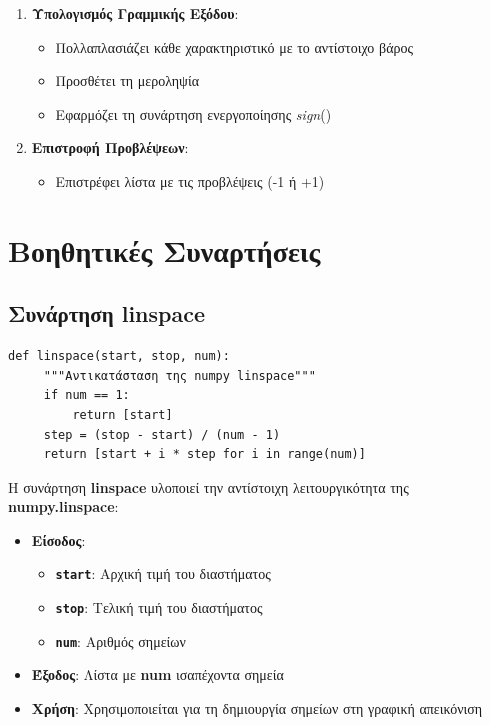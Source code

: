 \documentclass[12pt,a4paper,twoside]{book}
\begin{document}
\begin{enumerate}
    \item \textbf{Υπολογισμός Γραμμικής Εξόδου}:
    \begin{itemize}
        \item Πολλαπλασιάζει κάθε χαρακτηριστικό με το αντίστοιχο βάρος
        \item Προσθέτει τη μεροληψία
        \item Εφαρμόζει τη συνάρτηση ενεργοποίησης \textit{sign}() %
    \end{itemize}
    \item \textbf{Επιστροφή Προβλέψεων}:
    \begin{itemize}
        \item Επιστρέφει λίστα με τις προβλέψεις (-1 ή +1)
    \end{itemize}
\end{enumerate}

\section{Βοηθητικές Συναρτήσεις}

\subsection{Συνάρτηση linspace}

\begin{tcolorbox}[myCustomStyle = {perceptron.py}]
    \begin{lstlisting}[style=myPythonStyle]
 def linspace(start, stop, num):
     """Αντικατάσταση της numpy linspace"""
     if num == 1:
         return [start]
     step = (stop - start) / (num - 1)
     return [start + i * step for i in range(num)]
    \end{lstlisting}
\end{tcolorbox}

Η συνάρτηση \textbf{linspace} υλοποιεί την αντίστοιχη λειτουργικότητα της \textbf{numpy.linspace}:
\begin{itemize}
    \item \textbf{Είσοδος}:
    \begin{itemize}
        \item \textbf{\texttt{start}}: Αρχική τιμή του διαστήματος
        \item \textbf{\texttt{stop}}: Τελική τιμή του διαστήματος
        \item \textbf{\texttt{num}}: Αριθμός σημείων
    \end{itemize}
    \item \textbf{Έξοδος}: Λίστα με \textbf{num} ισαπέχοντα σημεία
    \item \textbf{Χρήση}: Χρησιμοποιείται για τη δημιουργία σημείων στη γραφική απεικόνιση
\end{itemize}
\end{document}
